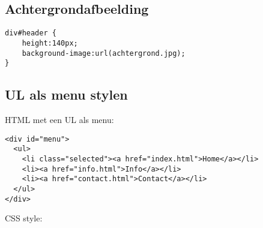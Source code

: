 \documentclass[8pt,pagesize,footinclude=false,headinclude=false]{scrartcl}
\begin{document}
\begin{multicols*}{4}
\subsection*{Achtergrondafbeelding}
\begin{lstlisting}
div#header {
	height:140px;
	background-image:url(achtergrond.jpg);
}
\end{lstlisting}

\subsection*{UL als menu stylen}
HTML met een UL als menu:
\begin{lstlisting}
<div id="menu"> 
  <ul>
	<li class="selected"><a href="index.html">Home</a></li>
    <li><a href="info.html">Info</a></li>
    <li><a href="contact.html">Contact</a></li>
  </ul>
</div>
\end{lstlisting}
CSS style:


\end{multicols*}
\end{document}
